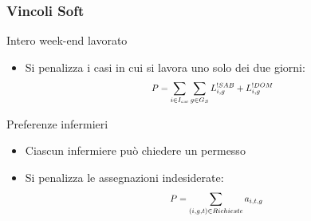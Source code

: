\documentclass[xcolor={dvipsnames, table}]{beamer}
\newcommand\scalemath[2]{\scalebox{#1}{\mbox{\ensuremath{\displaystyle #2}}}}
\begin{document}
\begin{frame}
	\frametitle{Vincoli Soft}
	\begin{block}{Intero week-end lavorato}
	\begin{itemize}
	\item Si penalizza i casi in cui si lavora uno solo dei due giorni:
	\begin{equation*}
		\scalemath{0.8}{
		\begin{aligned}
		P &= \sum_{i \in I_{cw}} \sum_{g \in G_S} L_{i, g}^{!SAB} + L_{i, g}^{!DOM}
		\end{aligned}
		}
	\end{equation*}
	\end{itemize}
	
	\end{block}
	\begin{block}{Preferenze infermieri}
	\begin{itemize}
	\item Ciascun infermiere può chiedere un permesso
	\item Si penalizza le assegnazioni indesiderate:
	\begin{equation*}
	\scalemath{0.8}{
	\begin{aligned}
	P = \sum_{(i, g, t) \in Richieste} a_{i, t, g}
	\end{aligned}
	}
	\end{equation*}
	\end{itemize}
	\end{block}
\end{frame}
\end{document}
